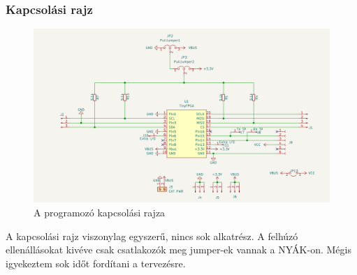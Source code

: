 \documentclass[a4paper,12pt,oneside]{book}
\begin{document}
\subsubsection{Kapcsolási rajz}
\begin{figure}[H]
	\centering
	\includegraphics[trim=1mm 1mm 1mm 1mm,scale=0.30]{kapcsolasi rajz.PNG}
	\caption{A programozó kapcsolási rajza}
	\label{teljes kapcsolási rajz}
\end{figure}
A kapcsolási rajz viszonylag egyszerű, nincs sok alkatrész. A felhúzó ellenállásokat kivéve csak csatlakozók meg jumper-ek vannak a NYÁK-on. Mégis igyekeztem sok időt fordítani a tervezésre.
\end{document}
